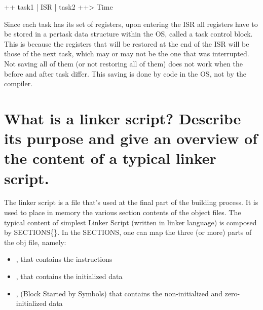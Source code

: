 ++ task1 | ISR | task2 ++> Time


Since each task has its set of registers, upon entering the ISR all registers have to be stored in a per­task data structure within the OS, called a task control block. This is because the registers that will be restored at the end of the ISR will be those of the next task, which may or may not be the one that was interrupted. Not saving all of them (or not restoring all of them) does not work when the before and after task differ. This saving is done by code in the OS, not by the compiler.

\section{What is a linker script? Describe its purpose and give an overview of the content of a typical linker script.}
The linker script is a file that's used at the final part of the building process. It is used to place in memory the various section contents of the object files. 
The typical content of simplest Linker Script (written in linker language) is composed by SECTIONS\{\}.
In the SECTIONS, one can map the three (or more) parts of the obj file, namely:
\begin{itemize}
	\item {}, that contains the instructions
	\item {}, that contains the initialized data
	\item {}, (Block Started by Symbols) that contains the non-initialized and zero-initialized data
\end{itemize}

